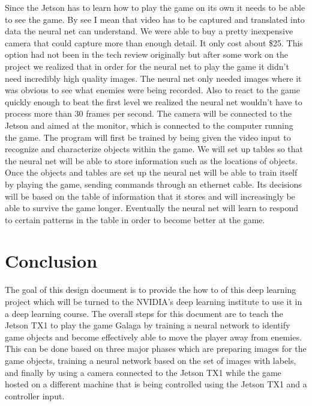 Since the Jetson has to learn how to play the game on its own it needs to be able to see the game.
By see I mean that video has to be captured and translated into data the neural net can understand.
We were able to buy a pretty inexpensive camera that could capture more than enough detail.
It only cost about \$25.
This option had not been in the tech review originally but after some work on the project we realized that in order for the neural net to play the game it didn't need incredibly high quality images.
The neural net only needed images where it was obvious to see what enemies were being recorded.
Also to react to the game quickly enough to beat the first level we realized the neural net wouldn't have to process more than 30 frames per second.
The camera will be connected to the Jetson and aimed at the monitor, which is connected to the computer running the game.
The program will first be trained by being given the video input to recognize and characterize objects within the game.
We will set up tables so that the neural net will be able to store information such as the locations of objects.
Once the objects and tables are set up the neural net will be able to train itself by playing the game, sending commands through an ethernet cable.
Its decisions will be based on the table of information that it stores and will increasingly be able to survive the game longer.
Eventually the neural net will learn to respond to certain patterns in the table in order to become better at the game.

\section{Conclusion}
The goal of this design document is to provide the how to of this deep learning project which will be turned to the NVIDIA's deep learning institute to use it in a deep learning course.
The overall steps for this document are to teach the Jetson TX1 to play the game Galaga by training a neural network to identify game objects and become effectively able to move the player away from enemies.
This can be done based on three major phases which are preparing images for the game objects, training a neural network based on the set of images with labels, and finally by using a camera connected to the Jetson TX1 while the game hosted on a different machine that is being controlled using the Jetson TX1 and a controller input.


